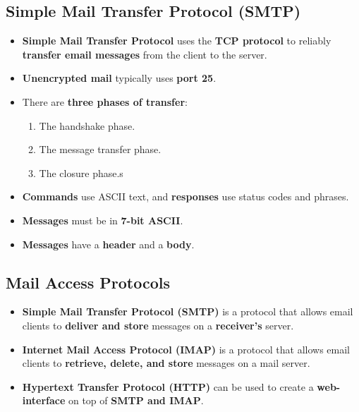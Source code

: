 \documentclass[16pt]{article}
\begin{document}
    \subsection*{Simple Mail Transfer Protocol (SMTP)}
    \begin{itemize}
        \item \textbf{Simple Mail Transfer Protocol} uses the \textbf{TCP protocol} to reliably \textbf{transfer email messages} from the client to the server.
        \item \textbf{Unencrypted mail} typically uses \textbf{port 25}.
        \item There are \textbf{three phases of transfer}:
        \begin{enumerate}
            \item The handshake phase.
            \item The message transfer phase.
            \item The closure phase.s
        \end{enumerate}
        \item \textbf{Commands} use ASCII text, and \textbf{responses} use status codes and phrases.
        \item \textbf{Messages} must be in \textbf{7-bit ASCII}.
        \item \textbf{Messages} have a \textbf{header} and a \textbf{body}.
    \end{itemize}

    \subsection*{Mail Access Protocols}
    \begin{itemize}
        \item \textbf{Simple Mail Transfer Protocol (SMTP)} is a protocol that allows email clients to \textbf{deliver and store} messages on a \textbf{receiver's} server.
        \item \textbf{Internet Mail Access Protocol (IMAP)} is a protocol that allows email clients to \textbf{retrieve, delete, and store} messages on a mail server.
        \item \textbf{Hypertext Transfer Protocol (HTTP)} can be used to create a \textbf{web-interface} on top of \textbf{SMTP and IMAP}.
    \end{itemize}

    \section*{}
\end{document}
